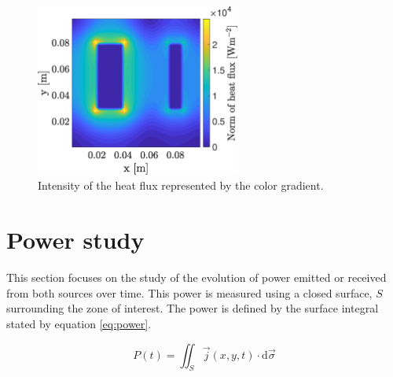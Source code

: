 \documentclass[a4paper,12pt,twoside]{article}
\begin{document}
\begin{figure}[h]
  \centering
  \includegraphics[width=0.6\textwidth]{graphs/c_heat_flux.eps}
  \caption{Intensity of the heat flux represented by the color gradient.}
  \label{fig:c-heat-flux}
\end{figure}

\section{Power study}
This section focuses on the study of the evolution of power emitted or received from both sources over time.
This power is measured using a closed surface, $S$ surrounding the zone of interest.
The power is defined by the surface integral stated by equation \eqref{eq:power}.

\begin{equation}
  P(t) = \iint_S \vec{j}(x,y,t)\cdot \text{d}\vec{\sigma}
  \label{eq:power}
\end{equation}
\end{document}
